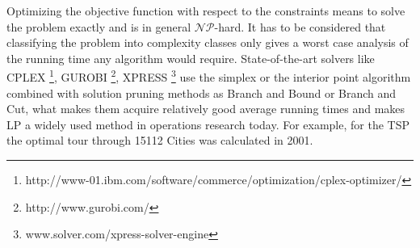 Optimizing the objective function with respect to the constraints means to solve the problem exactly and is in general $\mathcal{NP}$-hard. It has to be considered that classifying the problem into complexity classes only gives a worst case analysis of the running time any algorithm would require. State-of-the-art solvers like CPLEX \footnote{http://www-01.ibm.com/software/commerce/optimization/cplex-optimizer/}, GUROBI \footnote{http://www.gurobi.com/}, XPRESS \footnote{www.solver.com/xpress-solver-engine} use the simplex or the interior point algorithm combined with solution pruning methods as Branch and Bound or Branch and Cut, what makes them acquire relatively good average running times and makes LP a widely used method in operations research today. For example, for the TSP the optimal tour through 15112 Cities was calculated in 2001. \cite{applegate-01}
